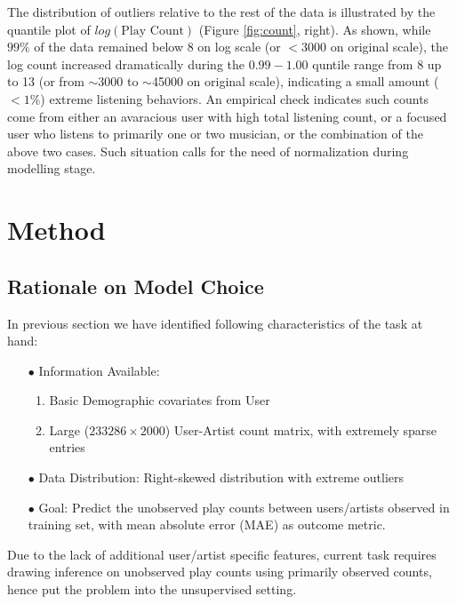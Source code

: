 \documentclass[11pt]{article}
\theoremstyle{definition}
\begin{document}
The distribution of outliers relative to the rest of the data is illustrated by the quantile plot of $log(\mbox{Play Count})$ (Figure \ref{fig:count}, right). As shown, while $99\%$ of the data remained below 8 on log scale (or $< 3000$ on original scale), the log count increased dramatically during the $0.99 - 1.00$ quntile range from 8 up to 13 (or from $\sim$3000 to $\sim$45000 on original scale), indicating a small amount ($<1\%$) extreme listening behaviors. An empirical check indicates such counts come from either an avaracious user with high total listening count, or a focused user who listens to primarily one or two musician, or the combination of the above two cases. Such situation calls for the need of normalization during modelling stage.

\vspace*{2em}

\section{\textbf{Method}}

\subsection{\textbf{Rationale on Model Choice}}

In previous section we have identified following characteristics of the  task at hand:

\begin{enumerate}
\item [$\bullet$] Information Available:
\begin{enumerate}
\item Basic Demographic covariates from User
\item Large ($233286 \times 2000$) User-Artist count matrix, with extremely sparse entries
\end{enumerate} 
\item [$\bullet$] Data Distribution: Right-skewed distribution with extreme outliers
\item [$\bullet$] Goal: Predict the unobserved play counts between  users/artists observed in training set, with mean absolute error (MAE) as outcome metric.
\end{enumerate}

Due to the lack of additional user/artist specific features, current task requires drawing inference on unobserved play counts using primarily observed counts, hence put the problem into the unsupervised setting.
\end{document}
